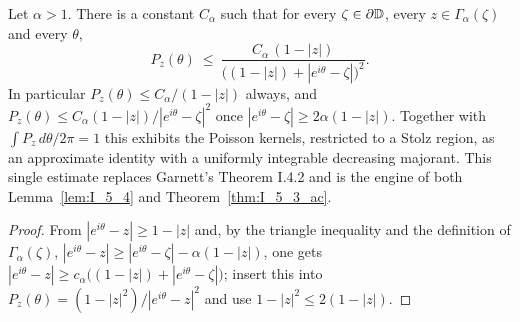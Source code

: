 \begin{lemma}
  \label{lem:poisson_stolz_bound}
  \leanok
  Let $\alpha>1$. There is a constant $C_\alpha$ such that for every
  $\zeta\in\partial\mathbb{D}$, every $z\in\Gamma_\alpha(\zeta)$ and every
  $\theta$,
  \[
    P_z(\theta)\ \le\
      \frac{C_\alpha\,(1-|z|)}{\bigl((1-|z|)+|e^{i\theta}-\zeta|\bigr)^{2}} .
  \]
  In particular $P_z(\theta)\le C_\alpha/(1-|z|)$ always, and
  $P_z(\theta)\le C_\alpha (1-|z|)/|e^{i\theta}-\zeta|^{2}$ once
  $|e^{i\theta}-\zeta|\ge 2\alpha(1-|z|)$. Together with
  $\int P_z\,d\theta/2\pi=1$ this exhibits the Poisson kernels, restricted to a
  Stolz region, as an approximate identity with a uniformly integrable
  decreasing majorant. This single estimate replaces Garnett's Theorem I.4.2
  and is the engine of both Lemma~\ref{lem:I_5_4} and
  Theorem~\ref{thm:I_5_3_ac}.
  \begin{proof}
    \leanok
    From $|e^{i\theta}-z|\ge 1-|z|$ and, by the triangle inequality and the
    definition of $\Gamma_\alpha(\zeta)$,
    $|e^{i\theta}-z|\ge|e^{i\theta}-\zeta|-\alpha(1-|z|)$, one gets
    $|e^{i\theta}-z|\ge c_\alpha\bigl((1-|z|)+|e^{i\theta}-\zeta|\bigr)$;
    insert this into $P_z(\theta)=(1-|z|^2)/|e^{i\theta}-z|^{2}$ and use
    $1-|z|^2\le 2(1-|z|)$.
  \end{proof}
\end{lemma}

